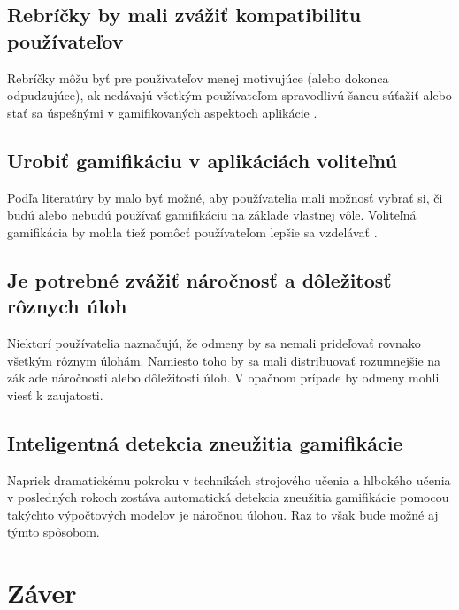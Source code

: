 \documentclass[10pt,twoside,slovak,a4paper]{article}
\begin{document}
\subsection{Rebríčky by mali zvážiť kompatibilitu používateľov} \label{Riešenie:Rebríčky by mali zvážiť kompatibilitu používateľov}
Rebríčky môžu byť pre používateľov menej motivujúce (alebo dokonca odpudzujúce), ak nedávajú všetkým používateľom spravodlivú šancu súťažiť alebo stať sa úspešnými v gamifikovaných aspektoch aplikácie \cite{rebríčky}.



\subsection{Urobiť gamifikáciu v aplikáciách voliteľnú} \label{Riešenie:Urobiť gamifikáciu aplikáciách voliteľnú}
Podľa literatúry \cite{volitelna} by malo byť možné, aby používatelia mali možnosť vybrať si, či budú alebo nebudú používať gamifikáciu na základe vlastnej vôle. Voliteľná gamifikácia by mohla tiež pomôcť používateľom lepšie sa vzdelávať \cite{volitelna}.

\subsection{Je potrebné zvážiť náročnosť a dôležitosť rôznych úloh} \label{Riešenie:Je potrebné zvážiť náročnosť a dôležitosť rôznych úloh}
Niektorí používatelia \cite{HadiMogavi2022} naznačujú, že odmeny by sa nemali prideľovať rovnako všetkým rôznym úlohám. Namiesto toho by sa mali distribuovať rozumnejšie na základe náročnosti alebo dôležitosti úloh. V opačnom prípade by odmeny mohli viesť k zaujatosti\cite{HadiMogavi2022}. 

\subsection{Inteligentná detekcia zneužitia gamifikácie} \label{Riešenie:Inteligentná detekcia zneužitia gamifikácie}
Napriek dramatickému pokroku v technikách strojového učenia a hlbokého učenia v posledných rokoch zostáva automatická detekcia zneužitia gamifikácie pomocou takýchto výpočtových modelov je náročnou úlohou\cite{HadiMogavi2022}. Raz to však bude možné aj týmto spôsobom.

 
\section{Záver} \label{zaver} %
\end{document}

